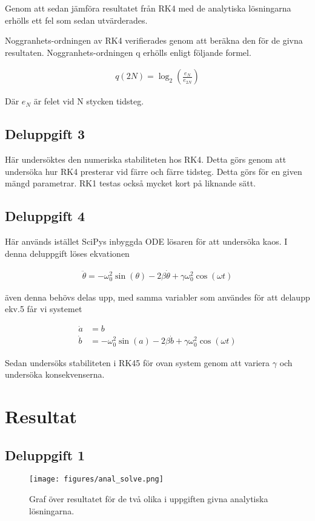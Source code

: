 \documentclass[12pt]{article}
\begin{document}
Genom att sedan jämföra resultatet från RK4 med de analytiska lösningarna erhölls ett fel som sedan utvärderades. 

Noggranhets-ordningen av RK4 verifierades genom att beräkna den för de givna resultaten. Noggranhets-ordningen q erhölls enligt följande formel.

\begin{align}
    q(2N) = \log_2 \left( \frac{e_N}{e_{2N}}\right)
\end{align}

Där $e_N$ är felet vid N stycken tidsteg.

\subsection{Deluppgift 3}
Här undersöktes den numeriska stabiliteten hos RK4. Detta görs genom att undersöka hur RK4 presterar vid färre och färre tidsteg. Detta görs för en given mängd parametrar. RK1 testas också mycket kort på liknande sätt. 

\subsection{Deluppgift 4}
Här används istället SciPys inbyggda ODE lösaren för att undersöka kaos. I denna deluppgift löses ekvationen

\begin{align}
    \ddot{\theta} = -\omega_0^2 \sin(\theta) - 2\beta \dot{\theta} + \gamma \omega_0^2 \cos(\omega t)
\end{align}

även denna behövs delas upp, med samma variabler som användes för att delaupp ekv.5 får vi systemet


\begin{align}
    \dot{a} &= b\\
    \dot{b} &= -\omega_0^2 \sin(a) - 2\beta \dot{b} + \gamma \omega_0^2 \cos(\omega t)
 \end{align}

Sedan undersöks stabiliteten i RK45 för ovan system genom att variera $\gamma$ och undersöka konsekvenserna. 

\section{Resultat}

\subsection{Deluppgift 1}
\begin{figure}[H]
    \begin{small}
        \begin{center}
            \texttt{[image: figures/anal\_solve.png]}
        \end{center}
        \caption{Graf över resultatet för de två olika i uppgiften givna analytiska lösningarna.}
        \label{fig:anal_sol}
    \end{small}
\end{figure}
\end{document}
